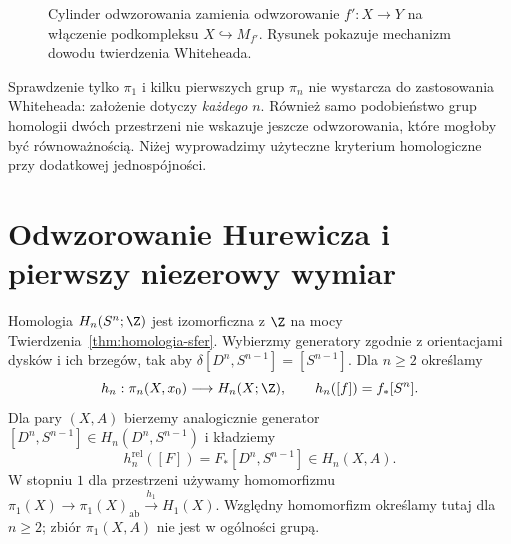 \begin{figure}[!htbp]
\centering
{}
\caption{Cylinder odwzorowania zamienia
odwzorowanie $f':X\to Y$ na włączenie
podkompleksu $X\hookrightarrow M_{f'}$.
Rysunek pokazuje mechanizm dowodu
twierdzenia Whiteheada.}
\label{fig:cylinder-whiteheada}
\end{figure}

\begin{uwaga}
Sprawdzenie tylko $\pi_1$
i kilku pierwszych grup
$\pi_n$ nie wystarcza
do zastosowania Whiteheada:
założenie dotyczy
\emph{każdego} $n$.
Również samo podobieństwo
grup homologii dwóch
przestrzeni nie wskazuje
jeszcze odwzorowania, które
mogłoby być równoważnością.
Niżej wyprowadzimy
użyteczne kryterium
homologiczne przy
dodatkowej jednospójności.
\end{uwaga}

\section{Odwzorowanie Hurewicza i pierwszy niezerowy wymiar}
\label{sec:hurewicz-wyzszy}

\begin{definicja}
\label{def:mapa-hurewicza}
Homologia $H_n(S^n;\Z)$
jest izomorficzna z $\Z$
na mocy
Twierdzenia~\ref{thm:homologia-sfer}.
Wybierzmy generatory zgodnie z orientacjami dysków i ich brzegów,
tak aby $\delta[D^n,S^{n-1}]=[S^{n-1}]$.
Dla $n\geq2$ określamy
\[
 h_n:\pi_n(X,x_0)\longrightarrow H_n(X;\Z),
 \qquad h_n([f])=f_*[S^n].
\]
Dla pary $(X,A)$ bierzemy
analogicznie generator
$[D^n,S^{n-1}]
\in H_n(D^n,S^{n-1})$ i
kładziemy
\[
 h_n^{\mathrm{rel}}([F])
 =F_*[D^n,S^{n-1}]
 \in H_n(X,A).
\]
W stopniu $1$ dla przestrzeni używamy homomorfizmu
$\pi_1(X)\to\pi_1(X)_{\mathrm{ab}}\xrightarrow{h_1}H_1(X)$.
Względny homomorfizm określamy tutaj dla $n\geq2$;
zbiór $\pi_1(X,A)$ nie jest w ogólności grupą.
\end{definicja}

